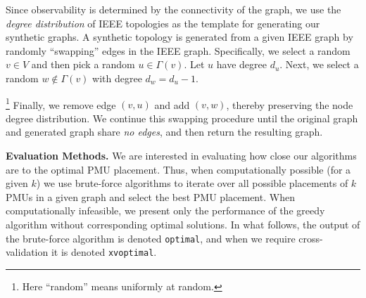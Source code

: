 Since observability is determined by the connectivity of the graph, we use the {\em degree distribution} of IEEE topologies as the template for generating our synthetic graphs.
A synthetic topology is generated from a given IEEE graph by randomly ``swapping'' edges in the IEEE graph. Specifically, we select a random $v \in V$ and then pick a random $u \in \Gamma(v)$. 
Let $u$ have degree $d_u$.  Next, we select a random $w \notin \Gamma(v)$ with degree $d_w = d_u -1$.  {\footnote {\small Here ``random'' means uniformly at random.}
Finally, we remove edge $(v,u)$ and add $(v,w)$, thereby preserving the node degree distribution.
We continue this swapping procedure until the original graph and generated graph share {\em no edges}, and then return the resulting graph.

\textbf{Evaluation Methods.}
We are interested in evaluating how close our algorithms are to the optimal PMU placement. 
Thus, when computationally possible (for a given $k$) we use brute-force algorithms to iterate over all possible placements of $k$ PMUs in a given graph and select the best PMU placement. When computationally infeasible, we present only the performance of the greedy algorithm without corresponding optimal solutions.
In what follows, the output of the brute-force algorithm is denoted {\tt optimal}, and when we require cross-validation it is denoted {\tt xvoptimal}.


}

